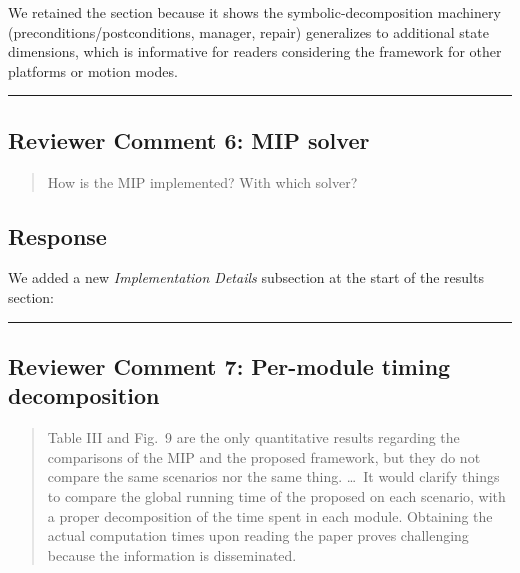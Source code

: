 We retained the section because it shows the symbolic-decomposition machinery (preconditions/postconditions, manager, repair) generalizes to additional state dimensions, which is informative for readers considering the framework for other platforms or motion modes.

\noindent\rule{17cm}{2.0pt}

\subsection{Reviewer Comment 6: MIP solver}
\begin{mdframed}
\begin{quote}
How is the MIP implemented? With which solver?
\end{quote}
\end{mdframed}

\subsection{Response}
We added a new \textit{Implementation Details} subsection at the start of the results section:

\textit{}

\noindent\rule{17cm}{2.0pt}

\subsection{Reviewer Comment 7: Per-module timing decomposition}
\begin{mdframed}
\begin{quote}
Table III and Fig.~9 are the only quantitative results regarding the comparisons of the MIP and the proposed framework, but they do not compare the same scenarios nor the same thing. \ldots\ It would clarify things to compare the global running time of the proposed on each scenario, with a proper decomposition of the time spent in each module. Obtaining the actual computation times upon reading the paper proves challenging because the information is disseminated.
\end{quote}
\end{mdframed}

